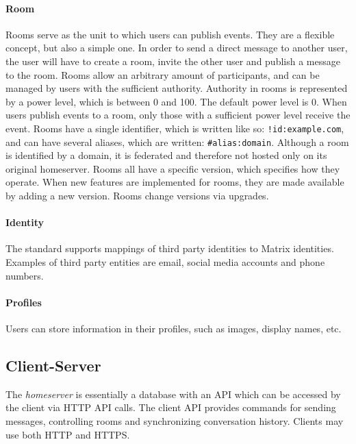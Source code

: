 \paragraph{Room}
Rooms serve as the unit to which users can publish events.
They are a flexible concept, but also a simple one.
In order to send a direct message to another user, the user will have to create a room, invite the other user and publish a message to the room.
Rooms allow an arbitrary amount of participants, and can be managed by users with the sufficient authority.
Authority in rooms is represented by a power level, which is between 0 and 100.
The default power level is 0.
When users publish events to a room, only those with a sufficient power level receive the event.
Rooms have a single identifier, which is written like so: \texttt{!id:example.com}, and can have several aliases, which are written: \texttt{\#alias:domain}.
Although a room is identified by a domain, it is federated and therefore not hosted only on its original homeserver.
Rooms all have a specific version, which specifies how they operate.
When new features are implemented for rooms, they are made available by adding a new version.
Rooms change versions via upgrades.

\paragraph{Identity}
The standard supports mappings of third party identities to Matrix identities.
Examples of third party entities are email, social media accounts and phone numbers.

\paragraph{Profiles}
Users can store information in their profiles, such as images, display names, etc.

\subsection{Client-Server}
The \textit{homeserver} is essentially a database with an \ac{API} which can be accessed by the client via \ac{HTTP} \ac{API} calls.
The client \ac{API} provides commands for sending messages, controlling rooms and synchronizing conversation history.
Clients may use both \ac{HTTP} and \ac{HTTPS}.

